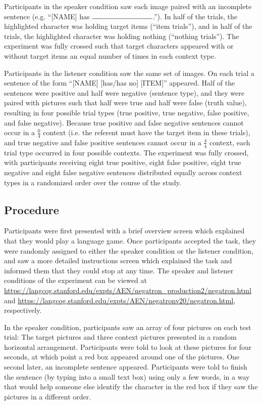\documentclass[man, noapacite]{apa2}
\begin{document}
Participants in the speaker condition saw each image paired with an incomplete sentence (e.g. ``[NAME] has $\rule{3cm}{0.15mm}$.''). In half of the trials, the highlighted character was holding target items (``item trials''), and in half of the trials, the highlighted character was holding nothing (``nothing trials'').  The experiment was fully crossed such that target characters appeared with or without target items an equal number of times in each context type.  

Participants in the listener condition saw the same set of images.  On each trial a sentence of the form ``[NAME] [has/has no] [ITEM]'' appeared.  Half of the sentences were positive and half were negative (sentence type), and they were paired with pictures such that half were true and half were false (truth value), resulting in four possible trial types (true positive, true negative, false positive, and false negative).  Because true positive and false negative sentences cannot occur in a $\frac{0}{4}$ context (i.e. the referent must have the target item in these trials), and true negative and false positive sentences cannot occur in a $\frac{4}{4}$ context, each trial type occurred in four possible contexts.  The experiment was fully crossed, with participants receiving eight true positive, eight false positive, eight true negative and eight false negative sentences distributed equally across context types in a randomized order over the course of the study.  

\subsection{Procedure}

Participants were first presented with a brief overview screen which explained that they would play a language game.  Once participants accepted the task, they were randomly assigned to either the speaker condition or the listener condition, and saw a more detailed instructions screen which explained the task and informed them that they could stop at any time. The speaker and listener conditions of the experiment can be viewed at \url{https://langcog.stanford.edu/expts/AEN/negatron_production2/negatron.html} and \url{https://langcog.stanford.edu/expts/AEN/negatronv20/negatron.html}, respectively.

In the speaker condition, participants saw an array of four pictures on each test trial: The target pictures and three context pictures presented in a random horizontal arrangement.  Participants were told to look at these pictures for four seconds, at which point a red box appeared around one of the pictures.  One second later, an incomplete sentence appeared.  Participants were told to finish the sentence (by typing into a small text box) using only a few words, in a way that would help someone else identify the character in the red box if they saw the pictures in a different order.
\end{document}
